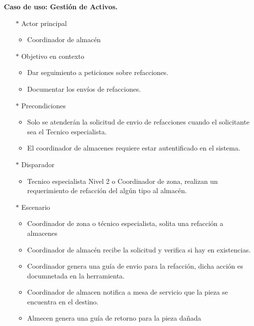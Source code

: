 \begin{multicols}{2}
	\textbf{Caso de uso: Gestión de Activos.}
	
	\begin{itemize}
		\item[$*$]  Actor principal
		\begin{itemize}
			\item Coordinador de almacén 
		\end{itemize}
		\item[$*$]  Objetivo en contexto
		\begin{itemize}
			\item Dar seguimiento a peticiones sobre refacciones.
			\item Documentar los envíos de refacciones.
			
		\end{itemize}
		\item[$*$]  Precondiciones
		\begin{itemize}
			\item Solo se atenderán la solicitud de envio de refacciones cuando el solicitante sea el Tecnico especialista.
			\item El coordinador de almacenes requiere estar autentificado en el sistema.
			
		\end{itemize}	
		\item[$*$]  Disparador
		\begin{itemize}
			\item Tecnico especialista Nivel 2 o Coordinador de zona, realizan un requerimiento de refacción del algún tipo al almacén.
		\end{itemize}
		\item[$*$]  Escenario
		\begin{itemize}
			\item Coordinador de zona o técnico especialista, solita una refacción a almacenes
			\item Coordinador de almacén recibe la  solicitud y verifica si hay en existencias.
			\item Coordinador genera una guía de envio para la refacción, dicha acción es documnetada en la herramienta. 
			\item Coordinador de almacen notifica a mesa de servicio que la pieza se encuentra en el destino. 
			\item Almecen genera una guía de retorno para la pieza dañada 
			

\end{itemize}
\end{itemize}
\end{multicols}
